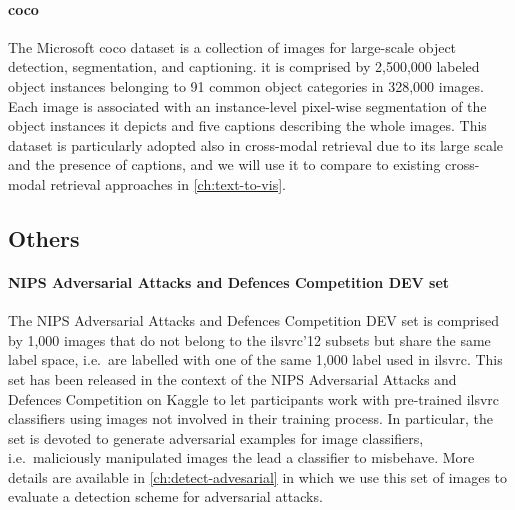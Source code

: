 \paragraph{\acrfull{coco}~\cite{lin2014microsoft}}

The Microsoft \acrfull{coco} dataset is a collection of images  for large-scale object detection, segmentation, and captioning.
it is comprised by 2,500,000 labeled object instances belonging to 91 common object categories in 328,000 images.
Each image is associated with an instance-level pixel-wise segmentation of the object instances it depicts and five captions describing the whole images.
This dataset is particularly adopted also in cross-modal retrieval due to its large scale and the presence of captions, and we will use it to compare to existing cross-modal retrieval approaches in \ref{ch:text-to-vis}.

\subsection{Others}

\paragraph{NIPS Adversarial Attacks and Defences Competition DEV set~\cite{kurakin2018adversarial}}
The NIPS Adversarial Attacks and Defences Competition DEV set is comprised by 1,000 images that do not belong to the \gls{ilsvrc}'12 subsets but share the same label space, i.e.\ are labelled with one of the same 1,000 label used in \gls{ilsvrc}.
This set has been released in the context of the NIPS Adversarial Attacks and Defences Competition on Kaggle to let participants work with pre-trained \gls{ilsvrc} classifiers using images not involved in their training process.
In particular, the set is devoted to generate adversarial examples for image classifiers, i.e.\ maliciously manipulated images the lead a classifier to misbehave.
More details are available in \ref{ch:detect-advesarial} in which we use this set of images to evaluate a detection scheme for adversarial attacks.
